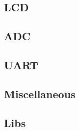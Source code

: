 \documentclass[12pt,a4paper,titlepage,oneside]{article}
\begin{document}
{




\subsection{LCD}




\subsection{ADC}




\subsection{UART}








\subsection{Miscellaneous}






\subsection{Libs}

}
\end{document}
